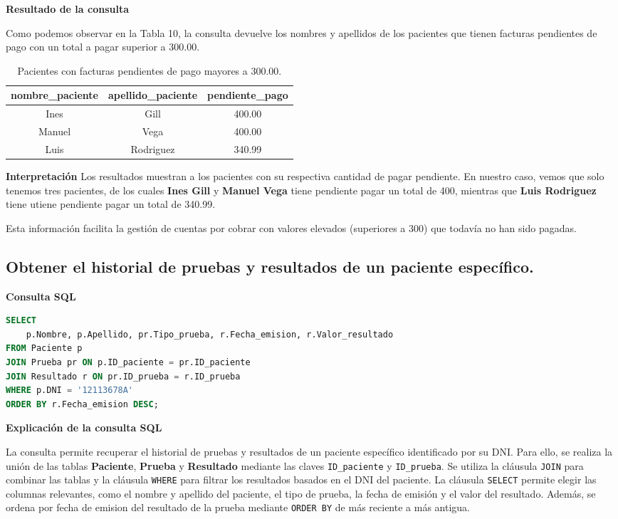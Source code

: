 \documentclass[spanish]{article}
\begin{document}
\textbf{Resultado de la consulta}

Como podemos observar en la Tabla 10, la consulta devuelve los nombres y apellidos de los pacientes que tienen facturas pendientes de pago con un total a pagar superior a 300.00.

\begin{table}[h!]
\centering
\begin{tabular}{|c|c|c|}
\hline
\textbf{nombre\_paciente} & \textbf{apellido\_paciente} & \textbf{pendiente\_pago} \\
\hline
Ines & Gill & 400.00 \\
\hline
Manuel & Vega & 400.00 \\
\hline
Luis & Rodriguez & 340.99 \\
\hline
\end{tabular}
\caption{Pacientes con facturas pendientes de pago mayores a 300.00.}
\label{tab:facturas_pendientes}
\end{table}


\textbf{Interpretación}
Los resultados muestran a los pacientes con su respectiva cantidad de pagar pendiente. En nuestro caso, vemos que solo tenemos tres pacientes, de los cuales \textbf{Ines Gill} y \textbf{Manuel Vega} tiene pendiente pagar un total de 400, mientras que \textbf{Luis Rodriguez} tiene utiene pendiente pagar un total de 340.99.

Esta información facilita la gestión de cuentas por cobrar con valores elevados (superiores a 300) que todavía no han sido pagadas. 

\subsection{Obtener el historial de pruebas y resultados de un paciente específico.}

\textbf{Consulta SQL}
\begin{lstlisting}[language=SQL]
SELECT 
    p.Nombre, p.Apellido, pr.Tipo_prueba, r.Fecha_emision, r.Valor_resultado
FROM Paciente p
JOIN Prueba pr ON p.ID_paciente = pr.ID_paciente
JOIN Resultado r ON pr.ID_prueba = r.ID_prueba
WHERE p.DNI = '12113678A'
ORDER BY r.Fecha_emision DESC;
\end{lstlisting}

\newpage
\textbf{Explicación de la consulta SQL}

La consulta permite recuperar el historial de pruebas y resultados de un paciente específico identificado por su DNI. Para ello, se realiza la unión de las tablas \textbf{Paciente}, \textbf{Prueba} y \textbf{Resultado} mediante las claves \texttt{ID\_paciente} y \texttt{ID\_prueba}. Se utiliza la cláusula \texttt{JOIN} para combinar las tablas y la cláusula \texttt{WHERE} para filtrar los resultados basados en el DNI del paciente. La cláusula \texttt{SELECT} permite elegir las columnas relevantes, como el nombre y apellido del paciente, el tipo de prueba, la fecha de emisión y el valor del resultado. Además, se ordena por fecha de emision del resultado de la prueba mediante \texttt{ORDER BY} de más reciente a más antigua.
\end{document}
